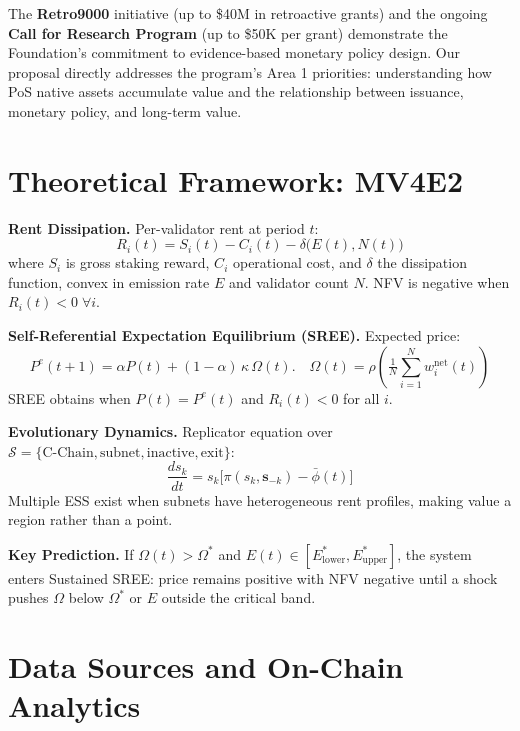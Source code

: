 \documentclass[11pt,a4paper]{article}
\begin{document}
The \textbf{Retro9000} initiative (up to \$40M in retroactive grants) and the ongoing \textbf{Call for Research Program} (up to \$50K per grant) demonstrate the Foundation's commitment to evidence-based monetary policy design. Our proposal directly addresses the program's Area 1 priorities: understanding how PoS native assets accumulate value and the relationship between issuance, monetary policy, and long-term value.

\section{Theoretical Framework: MV4E2}

\textbf{Rent Dissipation.} Per-validator rent at period $t$:
\begin{equation}
R_i(t) = S_i(t) - C_i(t) - \delta\bigl(E(t), N(t)\bigr) \label{eq:rent}
\end{equation}
where $S_i$ is gross staking reward, $C_i$ operational cost, and $\delta$ the dissipation function, convex in emission rate $E$ and validator count $N$. NFV is negative when $R_i(t) < 0\;\forall i$.

\textbf{Self-Referential Expectation Equilibrium (SREE).} Expected price:
\begin{equation}
P^e(t+1) = \alpha P(t) + (1-\alpha)\,\kappa\,\Omega(t). \quad
\Omega(t) = \rho\left(\tfrac{1}{N}\sum_{i=1}^{N} w_i^{\text{net}}(t)\right)
\label{eq:pe}
\end{equation}
SREE obtains when $P(t) = P^e(t)$ and $R_i(t) < 0$ for all $i$.

\textbf{Evolutionary Dynamics.} Replicator equation over $\mathcal{S} = \{\text{C-Chain}, \text{subnet}, \text{inactive}, \text{exit}\}$:
\begin{equation}
\frac{ds_k}{dt} = s_k\bigl[\pi(s_k, \mathbf{s}_{-k}) - \bar{\phi}(t)\bigr] \label{eq:rep}
\end{equation}
Multiple ESS exist when subnets have heterogeneous rent profiles, making value a region rather than a point.

\textbf{Key Prediction.} If $\Omega(t) > \Omega^*$ and $E(t) \in [E_{\text{lower}}^*, E_{\text{upper}}^*]$, the system enters Sustained SREE: price remains positive with NFV negative until a shock pushes $\Omega$ below $\Omega^*$ or $E$ outside the critical band.

\section{Data Sources and On-Chain Analytics}
\end{document}
